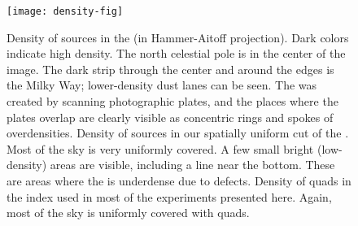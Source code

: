 \begin{figure}[htp]
%
%
%
%
%
%
\begin{center}
\texttt{[image: density-fig]}
\end{center}
\vspace{-20pt}
\caption{ Density of sources in the \USNOB 
(in Hammer-Aitoff projection).
Dark colors indicate high density.  The north
    celestial pole is in the center of the image.  
	The dark strip through the center and
    around the edges is the Milky Way; lower-density dust lanes can be
    seen.
	The \USNOB was created by scanning
    photographic plates, and the places where the plates overlap are
    clearly visible as concentric rings and spokes of overdensities.
     Density of sources in our spatially uniform
    cut of the \USNOB.  Most of the sky is
    very uniformly covered.  A few small bright (low-density) areas
    are visible, including a line near the bottom.  These are areas
    where the \USNOB is underdense due to defects.
     Density of quads in the index used in most
    of the experiments presented here.  Again, most of the sky is uniformly
	covered with quads.
\label{fig:density}}
\end{figure}


